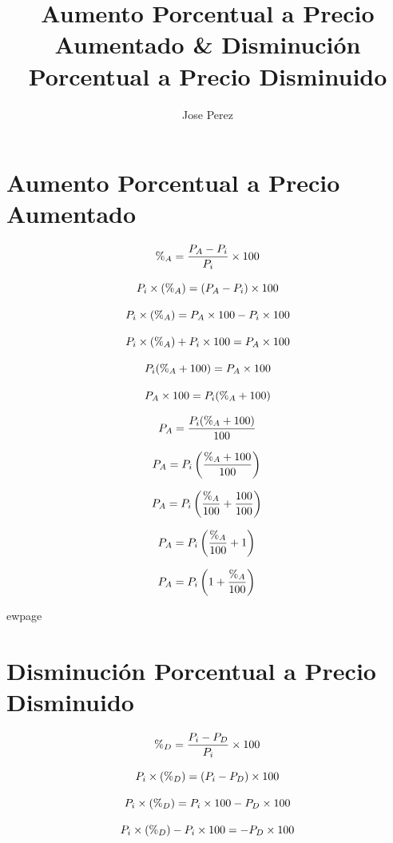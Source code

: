\documentclass[10pt]{article}         %
\title{Aumento Porcentual a Precio Aumentado \& Disminuci\'on Porcentual a Precio Disminuido}
\author{Jose Perez}
\begin{document}
\maketitle

\section{Aumento Porcentual a Precio Aumentado}
$$
\%_A=\frac{P_A-P_i}{P_i}\times 100 \\
$$

$$
P_i\times(\%_A)=(P_A-P_i)\times 100 \\
$$

$$
P_i\times(\%_A)=P_A\times 100-P_i\times 100 \\
$$

$$
P_i\times(\%_A)+P_i\times 100=P_A\times 100 \\
$$

$$
P_i(\%_A+100)=P_A\times 100 \\
$$

$$
P_A\times 100=P_i(\%_A+100) \\
$$

$$
P_A=\frac{P_i(\%_A+100)}{100} \\
$$

$$
P_A=P_i\left (\frac{\%_A+100}{100}  \right ) \\
$$

$$
P_A=P_i\left (\frac{\%_A}{100}+\frac{100}{100}  \right ) \\
$$

$$
P_A=P_i\left (\frac{\%_A}{100}+1  \right ) \\
$$

$$
P_A=P_i\left (1+\frac{\%_A}{100}  \right ) \\
$$


ewpage

\section{Disminuci\'on Porcentual a Precio Disminuido}
$$
\%_D=\frac{P_i-P_D}{P_i}\times 100 \\
$$

$$
P_i\times(\%_D)=(P_i-P_D)\times 100 \\
$$

$$
P_i\times(\%_D)=P_i\times 100-P_D\times 100 \\
$$

$$
P_i\times(\%_D)-P_i\times 100=-P_D\times 100 \\
$$
\end{document}
